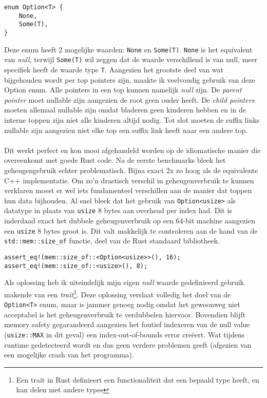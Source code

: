 \begin{verbatim}
enum Option<T> {
    None,
    Some(T),
}
\end{verbatim}

Deze enum heeft 2 mogelijke waarden: \texttt{None} en \texttt{Some(T)}.
\texttt{None} is het equivalent van \textit{null}, terwijl \texttt{Some(T)} wil zeggen dat de waarde verschillend is van null, meer specifiek heeft de waarde type \texttt{T}.
Aangezien het grootste deel van wat bijgehouden wordt per top pointers zijn, maakte ik veelvoudig gebruik van deze Option enum.
Alle pointers in een top kunnen namelijk \textit{null} zijn.
De \textit{parent pointer} moet nullable zijn aangezien de root geen ouder heeft.
De \textit{child pointers} moeten allemaal nullable zijn omdat bladeren geen kinderen hebben en in de interne toppen zijn niet alle kinderen altijd nodig.
Tot slot moeten de suffix links nullable zijn aangezien niet elke top een suffix link heeft naar een andere top.
\\ \\
Dit werkt perfect en kon mooi afgehandeld worden op de idiomatische manier die overeenkomt met goede Rust code.
Na de eerste benchmarks bleek het geheugengebruik echter problematisch.
Bijna exact 2x zo hoog als de equivalente C++ implementatie.
Om zo'n drastisch verschil in geheugenverbruik te kunnen verklaren moest er wel iets fundamenteel verschillen aan de manier dat toppen hun data bijhouden.
Al snel bleek dat het gebruik van \texttt{Option<usize>} als datatype in plaats van \texttt{usize} 8 bytes aan overhead per index had.
Dit is inderdaad exact het dubbele geheugenverbruik op een 64-bit machine aangezien een \texttt{usize} 8 bytes groot is.
Dit valt makkelijk te controleren aan de hand van de \texttt{std::mem::size\_of} functie, deel van de Rust standaard bibliotheek.
\begin{verbatim}
assert_eq!(mem::size_of::<Option<usize>>(), 16);
assert_eq!(mem::size_of::<usize>(), 8);
\end{verbatim}

Als oplossing heb ik uiteindelijk mijn eigen \textit{null} waarde gedefinieerd gebruik makende van een \textit{trait}\footnote{Een trait in Rust definieert een functionaliteit dat een bepaald type heeft, en kan delen met andere types}.
Deze oplossing verslaat volledig het doel van de \texttt{Option<T>} enum, maar is jammer genoeg nodig omdat het gewoonweg niet acceptabel is het geheugenverbruik te verdubbelen hiervoor.
Bovendien blijft memory safety gegarandeerd aangezien het foutief indexeren van de null value (\texttt{usize::MAX} in dit geval) een index-out-of-bounds error creëert.
Wat tijdens runtime gedetecteerd wordt en dus geen verdere problemen geeft (afgezien van een mogelijke crash van het programma).

